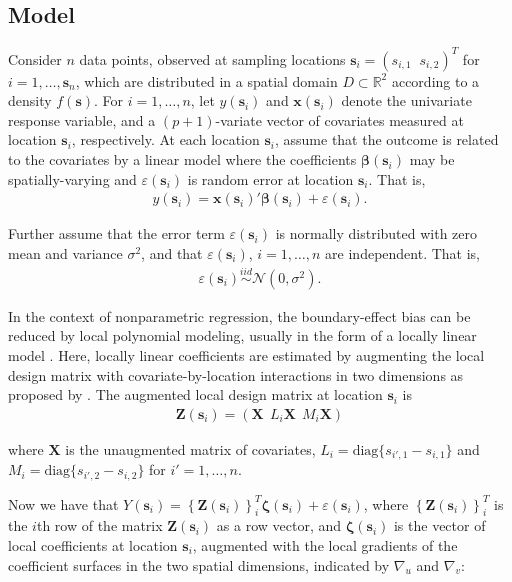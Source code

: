\documentclass[authoryear, review, 11pt]{elsarticle}
\begin{document}
	\subsection{Model}	
	Consider $n$ data points, observed at sampling locations $\bm{s}_i = (s_{i,1} \;\; s_{i,2})^T$ for $i = 1, \dots, \bm{s}_n$, which are distributed in a spatial domain $D \subset \mathbb{R}^2$ according to a density $f(\bm{s})$. For $i = 1, \dots, n$, let $y(\bm{s}_i)$ and $\bm{x}(\bm{s}_i)$ denote the univariate response variable, and a $(p+1)$-variate vector of covariates measured at location $\bm{s}_i$, respectively. At each location $\bm{s}_i$, assume that the outcome is related to the covariates by a linear model where the coefficients $\bm{\beta}(\bm{s}_i)$ may be spatially-varying and $\varepsilon(\bm{s}_i)$ is random error at location $\bm{s}_i$. That is,
	\begin{align}\label{eq:lm(s)}
		y(\bm{s}_i) = \bm{x}(\bm{s}_i)' \bm{\beta}(\bm{s}_i) + \varepsilon(\bm{s}_i).
	\end{align}
	
	Further assume that the error term $\varepsilon(\bm{s}_i)$ is normally distributed with zero mean and variance $\sigma^2$, and that $\varepsilon(\bm{s}_i)$, $i=1, \dots, n$ are independent. That is,
	\begin{align} \label{eq:err}
		\varepsilon(\bm{s}_i) \overset{iid}{\sim} \mathcal{N} \left( 0,\sigma^2 \right).
	\end{align}

    In the context of nonparametric regression, the boundary-effect bias can be reduced by local polynomial modeling, usually in the form of a locally linear model \citep{Fan-1996}. Here, locally linear coefficients are estimated by augmenting the local design matrix with covariate-by-location interactions in two dimensions as proposed by \cite{Wang:2008b}. The augmented local design matrix at location $\bm{s}_i$ is
    \begin{align}
		\bm{Z}(\bm{s}_i) = \left( \bm{X}  \:\: L_i \bm{X} \:\: M_i \bm{X} \right)
	\end{align} 
  
	where $\bm{X}$ is the unaugmented matrix of covariates, $L_i = \text{diag}\{s_{i',1} - s_{i,1}\}$ and $M_i = \text{diag}\{s_{i',2} - s_{i,2}\}$ for $i' = 1, \dots, n$.

    Now we have that $Y(\bm{s}_i) = \left\{ \bm{Z}(\bm{s}_i) \right\}^T_i \bm{\zeta}(\bm{s}_i) + \varepsilon(\bm{s}_i)$, where $\left\{ \bm{Z}(\bm{s}_i) \right\}^T_i$ is the $i$th row of the matrix $\bm{Z}(\bm{s}_i)$ as a row vector, and $\bm{\zeta}(\bm{s}_i)$ is the vector of local coefficients at location $\bm{s}_i$, augmented with the local gradients of the coefficient surfaces in the two spatial dimensions, indicated by $\nabla_u$ and $\nabla_v$:
\end{document}
